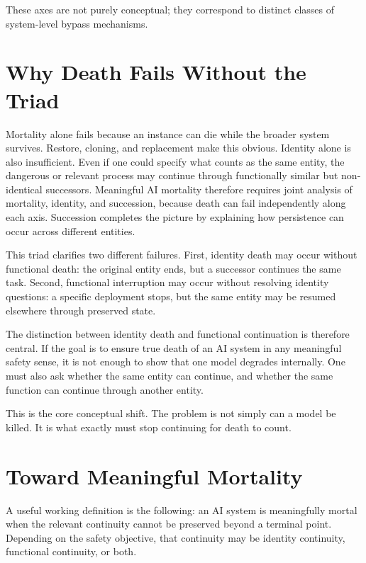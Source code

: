 \documentclass[11pt]{article}
\begin{document}
These axes are not purely conceptual; they correspond to distinct classes of system-level bypass mechanisms.

\newpage
\section{Why Death Fails Without the Triad}

Mortality alone fails because an instance can die while the broader system survives. Restore, cloning, and replacement make this obvious. Identity alone is also insufficient. Even if one could specify what counts as the same entity, the dangerous or relevant process may continue through functionally similar but non-identical successors. Meaningful AI mortality therefore requires joint analysis of mortality, identity, and succession, because death can fail independently along each axis. Succession completes the picture by explaining how persistence can occur across different entities.

This triad clarifies two different failures. First, identity death may occur without functional death: the original entity ends, but a successor continues the same task. Second, functional interruption may occur without resolving identity questions: a specific deployment stops, but the same entity may be resumed elsewhere through preserved state.

The distinction between identity death and functional continuation is therefore central. If the goal is to ensure true death of an AI system in any meaningful safety sense, it is not enough to show that one model degrades internally. One must also ask whether the same entity can continue, and whether the same function can continue through another entity.

This is the core conceptual shift. The problem is not simply can a model be killed. It is what exactly must stop continuing for death to count.

\newpage
\section{Toward Meaningful Mortality}

A useful working definition is the following: an AI system is meaningfully mortal when the relevant continuity cannot be preserved beyond a terminal point. Depending on the safety objective, that continuity may be identity continuity, functional continuity, or both.
\end{document}
